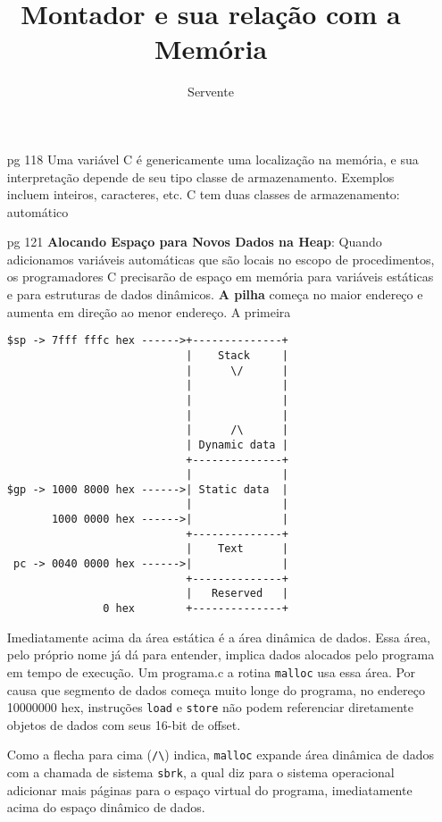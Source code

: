 \documentclass{article}
\author{Servente}
\title{Montador e sua relação com a Memória}
\begin{document}
\maketitle

\begin{enumerate}

\item[pg 118] Uma variável C é genericamente uma localização na memória, e sua 
interpretação depende de seu tipo classe de armazenamento. Exemplos incluem 
inteiros, caracteres, etc. C tem duas classes de armazenamento: automático  
\item[pg 121] \textbf{Alocando Espaço para Novos Dados na Heap}: Quando 
adicionamos variáveis automáticas que são locais no escopo de procedimentos, os 
programadores C precisarão de espaço em memória para variáveis estáticas e para 
estruturas de dados dinâmicos. \textbf{A pilha} começa no maior endereço e 
aumenta em direção ao menor endereço. A primeira 

\begin{verbatim}
$sp -> 7fff fffc hex ------>+--------------+
                            |    Stack     |
                            |      \/      |
                            |              |
                            |              |
                            |              |
                            |      /\      |
                            | Dynamic data |
                            +--------------+
                            |              |
$gp -> 1000 8000 hex ------>| Static data  |
                            |              |
       1000 0000 hex ------>|              |
                            +--------------+
                            |    Text      |
 pc -> 0040 0000 hex ------>|              |
                            +--------------+
                            |   Reserved   |
               0 hex        +--------------+
\end{verbatim}

Imediatamente acima da área estática é a área dinâmica de dados. Essa área, 
pelo próprio nome já dá para entender, implica dados alocados pelo programa em 
tempo de execução. Um programa.c a rotina \verb|malloc| usa essa área. Por 
causa que segmento de dados começa muito longe do programa, no endereço 
10000000 hex, instruções \verb|load| e \verb|store| não podem referenciar 
diretamente objetos de dados com seus 16-bit de offset.

Como a flecha para cima (\verb|/\|) indica, \verb|malloc| expande área dinâmica 
de dados com a chamada de sistema \verb|sbrk|, a qual diz para o sistema 
operacional adicionar mais páginas para o espaço virtual do programa, 
imediatamente acima do espaço dinâmico de dados.


\end{enumerate}
\end{document}
